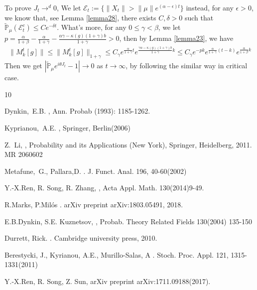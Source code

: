 \documentclass{article}
\begin{document}
To prove $J_t\rightarrow^d 0$, We let $\mathcal{E}_t:=\{\|X_t\|>\|\mu\|e^{(\alpha-\epsilon )t}\}$ instead, for any $\epsilon>0$, we know that, see Lemma \ref{lemma28}, there exists
$C,\delta >0$ such that  $\mathbb{\tilde{P}}_{\mu}(\mathcal{E}_t^c)\leq C e^{-\delta t}$. What's more, for any $0\leq \gamma <\beta$, we let $p=\frac{\alpha}{1+\beta}-\frac{\alpha}{1+\gamma} - \frac{\alpha\gamma-\kappa(g)(1+\gamma)b}{1+\gamma}>0$, then by Lemma \ref{lemma23}, we have
\begin{align*}
    \|M_k^t[g]\|\leq \|M_k^t[g]\|_{1+\gamma}\leq C_{\gamma} e^{\frac{\alpha}{1+\gamma}t}e^{\frac{\gamma \alpha-\kappa(g)(1+\gamma)b}{1+\gamma}k}\leq C_{\gamma} e^{-pk}e^{\frac{\alpha}{1+\gamma}(t-k)}e^{\frac{\alpha}{1+\beta}k}
\end{align*}
Then we get $  \left|\mathbb{\tilde{P}}_{\mu}e^{i\theta J_t}-1\right|\rightarrow 0$ as $ t\rightarrow \infty$, by following the similar way in critical case.
  

\begin{thebibliography} {10}

Dynkin,~E.B. 
, Ann. Probab (1993): 1185-1262.

Kyprianou,~A.E. 
, Springer, Berlin(2006)

Z.~Li,
, Probability and its Applications (New York), Springer, Heidelberg, 2011. MR 2060602

Metafune,~G., Pallara,D.
. J. Funct. Anal. 196, 40-60(2002)

Y.-X.Ren, R. Song, R. Zhang,
, Acta Appl. Math. 130(2014)9-49.

R.Marks, P.Mil\'{o}s
. arXiv preprint arXiv:1803.05491, 2018.

E.B.Dynkin, S.E. Kuznetsov,
, Probab. Theory Related Fields 130(2004) 135-150

Durrett, Rick.
. Cambridge university press, 2010.

Berestycki, J., Kyrianou, A.E., Murillo-Salas, A
. Stoch. Proc. Appl. 121, 1315-1331(2011)

Y.-X.Ren, R. Song, Z. Sun,
 arXiv preprint arXiv:1711.09188(2017).


\end{thebibliography}
\end{document}
